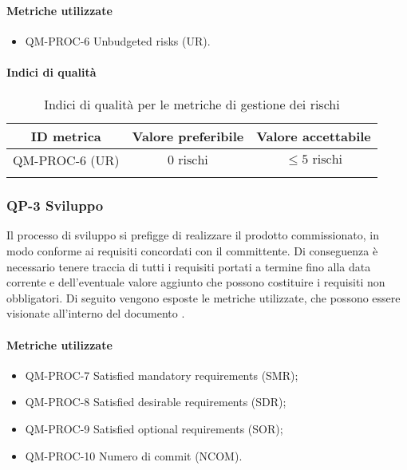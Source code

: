 		\paragraph{Metriche utilizzate}

			\begin{itemize}
				\item QM-PROC-6 Unbudgeted risks (UR).
			\end{itemize}

		\paragraph{Indici di qualità}

			\begin{center}
				\begin{longtable}{|c|c|c|}
				\hline
				\rowcolor{lighter-grayer}
				\textbf{ID metrica} & \textbf{Valore preferibile} & \textbf{Valore accettabile}\\
				\hline
				\endfirsthead
				\hline
				QM-PROC-6 (UR) & \(0 \text{ rischi}\) & \(\le 5 \text{ rischi}\) \\
				\hline
				\caption{Indici di qualità per le metriche di gestione dei rischi}
				\end{longtable}
			\end{center}
	\newpage
	\subsubsection{QP-3 Sviluppo}

		Il processo di sviluppo si prefigge di realizzare il prodotto commissionato, in modo conforme ai requisiti concordati con il committente.
		\newline
		Di conseguenza è necessario tenere traccia di tutti i requisiti portati a termine fino alla data corrente e dell'eventuale valore aggiunto che possono costituire i requisiti non obbligatori.
		\newline
		Di seguito vengono esposte le metriche utilizzate, che possono essere visionate all'interno del documento .

		\paragraph{Metriche utilizzate}

			\begin{itemize}
				\item QM-PROC-7 Satisfied mandatory requirements (SMR);
				\item QM-PROC-8 Satisfied desirable requirements (SDR);
				\item QM-PROC-9 Satisfied optional requirements (SOR);
				\item QM-PROC-10 Numero di commit (NCOM).
			\end{itemize}


